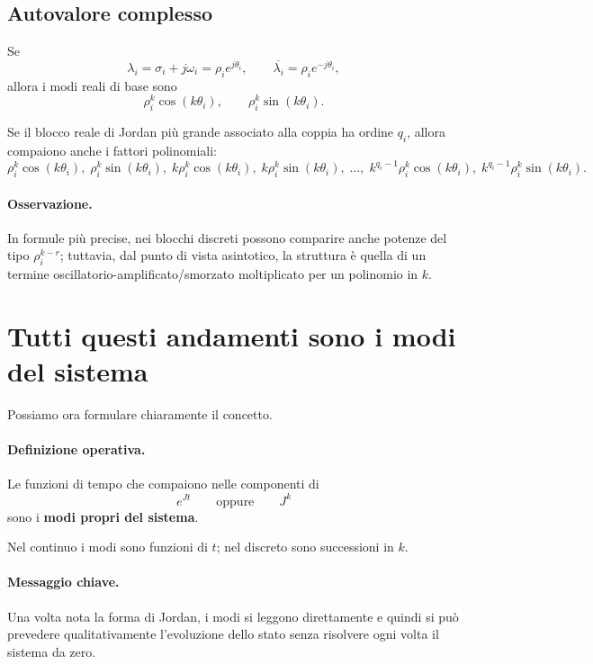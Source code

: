\subsection{Autovalore complesso}

Se
\[
\lambda_i=\sigma_i+j\omega_i=\rho_i e^{j\theta_i},
\qquad
\overline{\lambda_i}=\rho_i e^{-j\theta_i},
\]
allora i modi reali di base sono
\begin{equation}
\rho_i^k \cos(k\theta_i),
\qquad
\rho_i^k \sin(k\theta_i).
\label{eq:L9_modes_complex_DT_base}
\end{equation}

Se il blocco reale di Jordan più grande associato alla coppia ha ordine $q_i$, allora compaiono anche i fattori polinomiali:
\begin{equation}
\rho_i^k \cos(k\theta_i),\;
\rho_i^k \sin(k\theta_i),\;
k\rho_i^k \cos(k\theta_i),\;
k\rho_i^k \sin(k\theta_i),\;
\dots,\;
k^{q_i-1}\rho_i^k \cos(k\theta_i),\;
k^{q_i-1}\rho_i^k \sin(k\theta_i).
\label{eq:L9_modes_complex_DT}
\end{equation}

\paragraph{Osservazione.}
In formule più precise, nei blocchi discreti possono comparire anche potenze del tipo $\rho_i^{k-r}$; tuttavia, dal punto di vista asintotico, la struttura è quella di un termine oscillatorio-amplificato/smorzato moltiplicato per un polinomio in $k$.

\section{Tutti questi andamenti sono i modi del sistema}

Possiamo ora formulare chiaramente il concetto.

\paragraph{Definizione operativa.}
Le funzioni di tempo che compaiono nelle componenti di
\[
e^{Jt}
\qquad \text{oppure} \qquad
J^k
\]
sono i \textbf{modi propri del sistema}.

Nel continuo i modi sono funzioni di $t$; nel discreto sono successioni in $k$.

\paragraph{Messaggio chiave.}
Una volta nota la forma di Jordan, i modi si leggono direttamente e quindi si può prevedere qualitativamente l'evoluzione dello stato senza risolvere ogni volta il sistema da zero.


